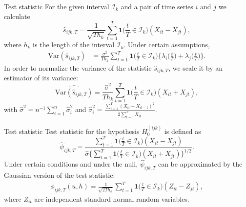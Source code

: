 \documentclass[10pt]{beamer}
\newcommand{\Var}{\mathrm{Var}}
\newcommand{\ind}{\boldsymbol{1}\Big( \frac{t}{T} \in \mathcal{I}_k \Big)} %
\newcommand{\indsmall}{\boldsymbol{1}\big( \frac{t}{T} \in \mathcal{I}_k \big)} %
\begin{document}
\begin{frame}{Test statistic}
For the given interval $\mathcal{I}_k$ and a pair of time series $i$ and $j$ we calculate
\begin{equation*}
\hat{s}_{ijk,T} = \frac{1}{\sqrt{T h_k}} \sum\limits_{t=1}^T \ind (X_{it} -X_{jt}), 
\end{equation*}
where $h_k$ is the length of the interval $\mathcal{I}_k$. \pause Under certain assumptions, 
\begin{align*}
\Var(\hat{s}_{ijk,T})  & = \frac{\sigma^2}{Th_k} \sum\limits_{t=1}^T \ind \Big\{ \lambda_i\Big(\frac{t}{T}\Big) + \lambda_j\Big(\frac{t}{T}\Big) \Big\}. 
\end{align*}\pause
In order to normalize the variance of the statistic $\hat{s}_{ijk,T}$, we scale it by an estimator of its variance:
\[ \widehat{\Var(\hat{s}_{ijk,T})} = \frac{\hat{\sigma}^2}{Th_k} \sum\limits_{t=1}^T \ind (X_{it} + X_{jt} ), \]
with $\hat{\sigma}^2 = n^{-1} \sum_{i = 1}^n \hat{\sigma}_i^2$ and $\hat{\sigma}_i^2 = \frac{\sum_{t=2}^T (X_{it}-X_{it-1})^2}{2 \sum_{t=1}^T X_{it}}$.\hyperlink{frame_sigma}{}
\end{frame}


\begin{frame}[label = frame_teststatistic]{Test statistic}
Test statistic for the hypothesis $H_0^{(ijk)}$ is defined as
\begin{equation*}
\widehat{\psi}_{ijk, T} = \frac{\sum\nolimits_{t=1}^T \indsmall (X_{it} -X_{jt})}{\hat{\sigma} \big\{ \sum\nolimits_{t=1}^T \indsmall  (X_{it} + X_{jt} )\big\}^{1/2}}. 
\end{equation*} \pause
Under certain conditions and under the null, $\widehat{\psi}_{ijk, T}$ can be approximated by the Gaussian version of the test statistic:
\begin{align*}
\phi_{ijk,T}(u,h) = \frac{1}{\sqrt{2 T h_k}} \sum\limits_{t=1}^T \ind (Z_{it} - Z_{jt}), 
\end{align*}
where $Z_{it}$ are independent standard normal random variables.
\end{frame}
\end{document}
